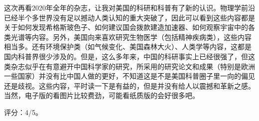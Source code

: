 这次再看2020年全年的杂志，让我对美国的科研和科普有了新的认识。物理学前沿已经半个多世界没有足以撼动人类认知的重大突破了，因此可以看到这些内容都是关于如何发现希格斯玻色子、如何建议国会拨款建造加速器、如何观察宇宙中的各类光谱等内容。另外，美国向来喜欢研究生物医学（包括精神疾病类），这些内容相当多。还有环境保护类（如气候变化、美国森林大火）、人类学等内容，这都是国内科普界很少涉及的。但是，这么多年来，中国的科研事实上已经很强了，但这类杂志似乎在有意避开中国科学家的研究，所采用的研究论文和成果（特别是欧洲一些国家）并没有比中国人做的更好，不知道这是不是美国科普圈子里一向的偏见还是歧视。这些内容，平时读一下是有益的，但是并没有给人以震撼和革新之感。当然，电子版的看图片比较费劲，可能看纸质版的会好很多吧。

评分：4/5。